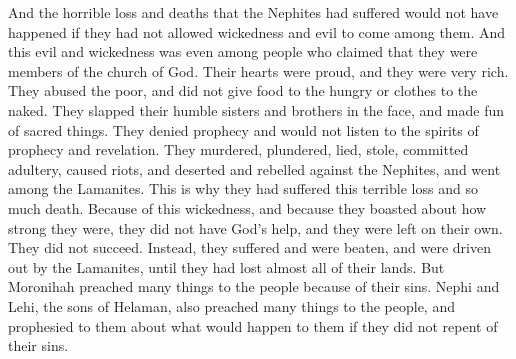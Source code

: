 And the horrible loss and deaths that the Nephites had suffered would not have happened if they had not allowed wickedness and evil to come among them. And this evil and wickedness was even among people who claimed that they were members of the church of God.
\bverse \iffalse And it was because of the pride of their hearts, because of their exceeding riches, yea, it was because of their oppression to the poor, withholding their food from the hungry, withholding their clothing from the naked, and smiting their humble brethren upon the cheek, making a mock of that which was sacred, denying the spirit of prophecy and of revelation, murdering, plundering, lying, stealing, committing adultery, rising up in great contentions, and deserting away into the land of Nephi, among the Lamanites-- \fi
Their hearts were proud, and they were very rich. They abused the poor, and did not give food to the hungry or clothes to the naked. They slapped their humble sisters and brothers in the face, and made fun of sacred things. They denied prophecy and would not listen to the spirits of prophecy and revelation. They murdered, plundered, lied, stole, committed adultery, caused riots, and deserted and rebelled against the Nephites, and went among the Lamanites. This is why they had suffered this terrible loss and so much death.
\bverse \iffalse And because of this their great wickedness, and their boastings in their own strength, they were left in their own strength; therefore they did not prosper, but were afflicted and smitten, and driven before the Lamanites, until they had lost possession of almost all their lands. \fi
Because of this wickedness, and because they boasted about how strong they were, they did not have God's help, and they were left on their own. They did not succeed. Instead, they suffered and were beaten, and were driven out by the Lamanites, until they had lost almost all of their lands.
\bverse \iffalse But behold, Moronihah did preach many things unto the people because of their iniquity, and also Nephi and Lehi, who were the sons of Helaman, did preach many things unto the people, yea, and did prophesy many things unto them concerning their iniquities, and what should come unto them if they did not repent of their sins. \fi
But Moronihah preached many things to the people because of their sins. Nephi and Lehi, the sons of Helaman, also preached many things to the people, and prophesied to them about what would happen to them if they did not repent of their sins.
\bverse \iffalse And it came to pass that they did repent, and inasmuch as they did repent they did begin to prosper. \fi
